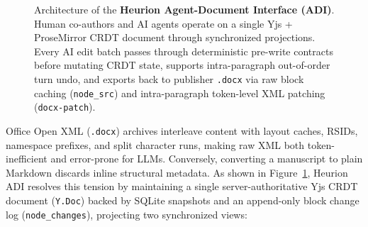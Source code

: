 \documentclass[11pt,a4paper]{article}
\begin{document}
\begin{figure}[!t]
{
}
\caption{Architecture of the \textbf{Heurion Agent-Document Interface (ADI)}. Human co-authors and AI agents operate on a single Yjs + ProseMirror CRDT document through synchronized projections. Every AI edit batch passes through deterministic pre-write contracts before mutating CRDT state, supports intra-paragraph out-of-order turn undo, and exports back to publisher \texttt{.docx} via raw block caching (\texttt{node\_src}) and intra-paragraph token-level XML patching (\texttt{docx-patch}).}
\label{fig:adi_architecture}
\end{figure}

Office Open XML (\texttt{.docx}) archives interleave content with layout caches, RSIDs, namespace prefixes, and split character runs, making raw XML both token-inefficient and error-prone for LLMs. Conversely, converting a manuscript to plain Markdown discards inline structural metadata. As shown in Figure~\ref{fig:adi_architecture}, Heurion ADI resolves this tension by maintaining a single server-authoritative Yjs CRDT document (\texttt{Y.Doc}) \cite{nicolaescu2016yjs} backed by SQLite snapshots and an append-only block change log (\texttt{node\_changes}), projecting two synchronized views:
\end{document}
